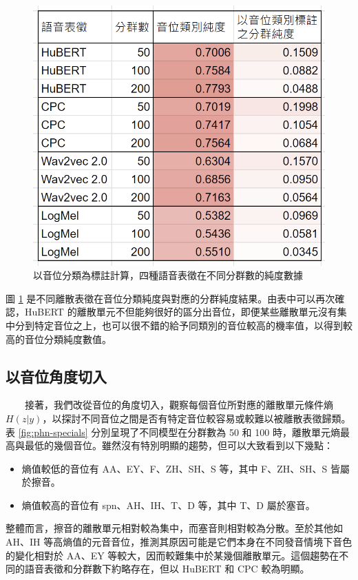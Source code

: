 \begin{figure}
        \centering
        \includegraphics[width=0.55\linewidth]{figures/pcls-pur.png}
    \caption{以音位分類為標註計算，四種語音表徵在不同分群數的純度數據}
    \label{fig:pcls}
    \end{figure}

        圖 \ref{fig:pcls} 是不同離散表徵在音位分類純度與對應的分群純度結果。由表中可以再次確認，HuBERT 的離散單元不但能夠很好的區分出音位，即便某些離散單元沒有集中分到特定音位之上，也可以很不錯的給予同類別的音位較高的機率值，以得到較高的音位分類純度數值。


\subsection{以音位角度切入}

　　接著，我們改從音位的角度切入，觀察每個音位所對應的離散單元條件熵 $H(z|y)$，以探討不同音位之間是否有特定音位較容易或較難以被離散表徵歸類。表 \ref{fig:phn-specials} 分別呈現了不同模型在分群數為 50 和 100 時，離散單元熵最高與最低的幾個音位。雖然沒有特別明顯的趨勢，但可以大致看到以下幾點：

\begin{itemize}
    \item 熵值較低的音位有 AA、EY、F、ZH、SH、S 等，其中 F、ZH、SH、S 皆屬於擦音。
    \item 熵值較高的音位有 spn、AH、IH、T、D 等，其中 T、D 屬於塞音。  %
\end{itemize}

        整體而言，擦音的離散單元相對較為集中，而塞音則相對較為分散。至於其他如 AH、IH 等高熵值的元音音位，推測其原因可能是它們本身在不同發音情境下音色的變化相對於 AA、EY 等較大，因而較難集中於某幾個離散單元。這個趨勢在不同的語音表徵和分群數下約略存在，但以 HuBERT 和 CPC 較為明顯。


